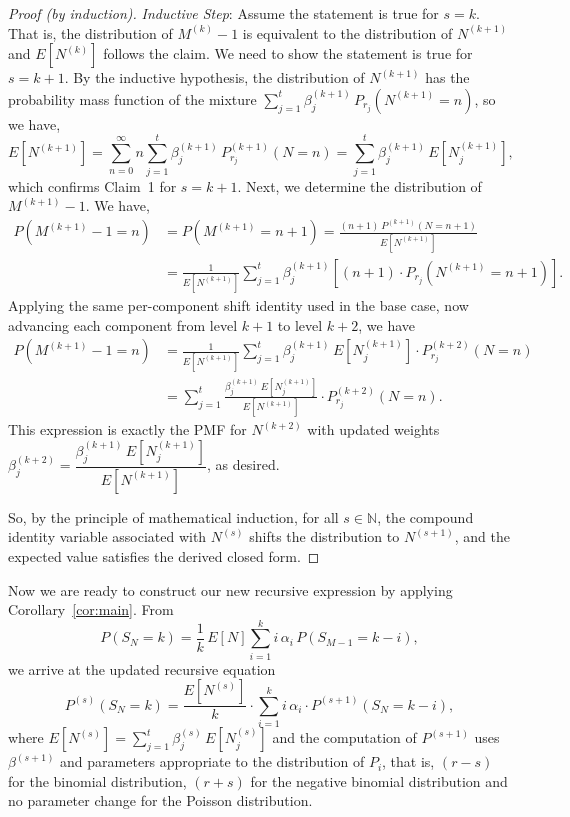 \documentclass[11pt]{amsart}
\theoremstyle{definition}
\theoremstyle{plain}
\begin{document}
\begin{proof}[Proof (by induction)]
\medskip
\textit{Inductive Step}: Assume the statement is true for $s = k$.  That is, the distribution
of $M^{(k)} - 1$ is equivalent to the distribution of $N^{(k+1)}$ and $E[N^{(k)}]$ follows the
claim.  We need to show the statement is true for $s = k + 1$.  By the inductive hypothesis,
the distribution of $N^{(k+1)}$ has the probability mass function of the mixture
$\sum_{j=1}^{t}\beta_j^{(k+1)}\,P_{r_j}(N^{(k+1)} = n)$, so we have,
\[
    E[N^{(k+1)}]
    = \sum_{n=0}^{\infty} n \sum_{j=1}^{t}\beta_j^{(k+1)}\,P_{r_j}^{(k+1)}(N = n)
    = \sum_{j=1}^{t}\beta_j^{(k+1)}\,E[N_j^{(k+1)}],
\]
which confirms Claim~1 for $s = k+1$.  Next, we determine the distribution of
$M^{(k+1)} - 1$.  We have,
\begin{align*}
P(M^{(k+1)} - 1 = n)
    &= P(M^{(k+1)} = n+1)
     = \frac{(n+1)\,P^{(k+1)}(N = n+1)}{E[N^{(k+1)}]} \\
    &= \frac{1}{E[N^{(k+1)}]}
       \sum_{j=1}^{t}\beta_j^{(k+1)}\!\left[(n+1)\cdot P_{r_j}(N^{(k+1)} = n+1)\right].
\end{align*}
Applying the same per-component shift identity used in the base case, now advancing each
component from level $k+1$ to level $k+2$, we have
\begin{align*}
P(M^{(k+1)} - 1 = n)
    &= \frac{1}{E[N^{(k+1)}]}
       \sum_{j=1}^{t}\beta_j^{(k+1)}\, E[N_j^{(k+1)}] \cdot P_{r_j}^{(k+2)}(N = n) \\
    &= \sum_{j=1}^{t}
       \frac{\beta_j^{(k+1)}\, E[N_j^{(k+1)}]}{E[N^{(k+1)}]} \cdot P_{r_j}^{(k+2)}(N = n).
\end{align*}
This expression is exactly the PMF for $N^{(k+2)}$ with updated weights
$\beta_j^{(k+2)} = \dfrac{\beta_j^{(k+1)}\, E[N_j^{(k+1)}]}{E[N^{(k+1)}]}$, as desired.

So, by the principle of mathematical induction, for all $s \in \mathbb{N}$, the compound
identity variable associated with $N^{(s)}$ shifts the distribution to $N^{(s+1)}$, and
the expected value satisfies the derived closed form.
\end{proof}

Now we are ready to construct our new recursive expression by applying
Corollary~\ref{cor:main}.  From
\[
    P(S_N = k) = \frac{1}{k}\,E[N]\sum_{i=1}^{k} i\,\alpha_i\,P(S_{M-1} = k - i),
\]
we arrive at the updated recursive equation
\[
    P^{(s)}(S_N = k)
    = \frac{E[N^{(s)}]}{k} \cdot \sum_{i=1}^{k} i\,\alpha_i \cdot P^{(s+1)}(S_N = k - i),
\]
where $E[N^{(s)}] = \sum_{j=1}^{t}\beta_j^{(s)}\,E[N_j^{(s)}]$ and the computation of
$P^{(s+1)}$ uses $\beta^{(s+1)}$ and parameters appropriate to the distribution of $P_i$,
that is, $(r - s)$ for the binomial distribution, $(r + s)$ for the negative binomial
distribution and no parameter change for the Poisson distribution.
\end{document}
